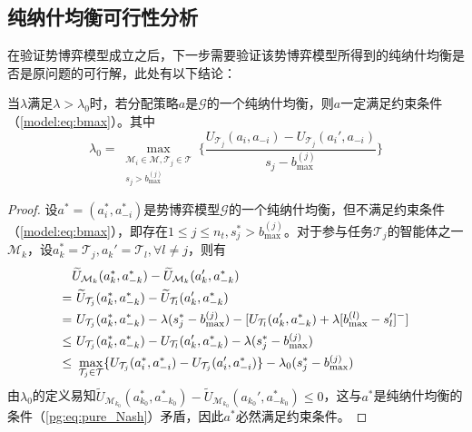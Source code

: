 \subsection{纯纳什均衡可行性分析}
\label{pg:mwlu:pgexist}
在验证势博弈模型成立之后，下一步需要验证该势博弈模型所得到的纯纳什均衡是否是原问题的可行解，此处有以下结论：

\begin{proposition}[纳什均衡可行性]
\label{pg:pro:feasibility}
	当$\lambda$满足$\lambda > \lambda_0$时，若分配策略$a$是$\mathcal{G}$的一个纯纳什均衡，则$a$一定满足约束条件（\ref{model:eq:bmax}）。其中
	\begin{equation}
		\lambda_0 = \max_{\substack{\mathcal{M}_i \in \mathcal{M}, \mathcal{T}_j \in \mathcal{T} \\ s_j > b_{\text{max}}^{(j)}}} \Bigg\{ \frac{U_{\mathcal{T}_j}(a_i,a_{-i}) - U_{\mathcal{T}_j}(a_i',a_{-i})}{s_j-b_{\text{max}}^{(j)}} \Bigg\}
	\end{equation}
	
	\begin{proof}
		设$a^*=(a_i^*,a_{-i}^*)$是势博弈模型$\mathcal{G}$的一个纯纳什均衡，但不满足约束条件（\ref{model:eq:bmax}），即存在$1\leq j \leq n_t, s_j^* > b_{\text{max}}^{(j)}$。对于参与任务$\mathcal{T}_j$的智能体之一$\mathcal{M}_k$，设$a_k^*=\mathcal{T}_j,a_k'=\mathcal{T}_l,\forall l \neq j$，则有
		\begin{align}
			&\widetilde U_{\mathcal{M}_k}(a_k^*,a_{-k}^*) - \widetilde U_{\mathcal{M}_k}(a_k',a_{-k}^*)\notag\\
		    =&\ \widetilde U_{\mathcal{T}_j}(a_k^*,a_{-k}^*) - \widetilde U_{\mathcal{T}_l}(a_k',a_{-k}^*)\notag\\
		    =&\ U_{\mathcal{T}_j}(a_k^*,a_{-k}^*) - \lambda(s_j^*-b_{\text{max}}^{(j)}) - [U_{\mathcal{T}_l}(a_k',a_{-k}^*) + \lambda[b_{\text{max}}^{(l)} - s_l']^-]\notag\\
		    \leq &\ U_{\mathcal{T}_j}(a_k^*,a_{-k}^*) - U_{\mathcal{T}_l}(a_k',a_{-k}^*) - \lambda(s_j^*-b_{\text{max}}^{(j)}) \notag \\
		    \leq &\ \max_{\mathcal{T}_j \in \mathcal{T}} \{U_{\mathcal{T}_j}(a_i^*,a_{-i}^*) - U_{\mathcal{T}_j}(a_i',a_{-i}^*)\} - \lambda_0(s_j^*-b_{\text{max}}^{(j)})
		\end{align}
		由$\lambda_0$的定义易知$\widetilde U_{\mathcal{M}_{k_0}}(a_{k_0}^*,a_{-{k_0}}^*) - \widetilde U_{\mathcal{M}_{k_0}}(a_{k_0}',a_{-{k_0}}^*) \leq 0$，这与$a^*$是纯纳什均衡的条件（\ref{pg:eq:pure_Nash}）矛盾，因此$a^*$必然满足约束条件。
	\end{proof}
	
\end{proposition}

